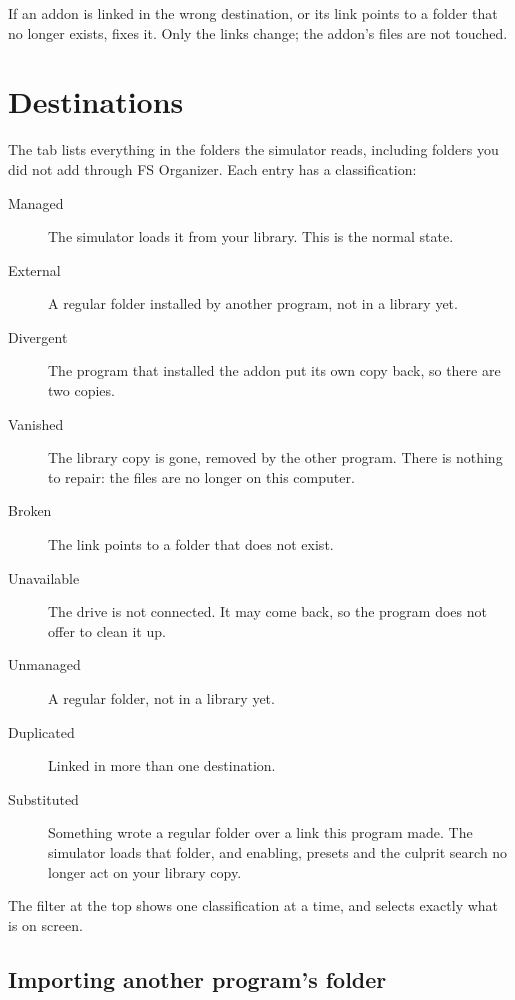\documentclass[11pt,a4paper]{article}
\begin{document}
If an addon is linked in the wrong destination, or its link points to a folder
that no longer exists,  fixes it. Only
the links change; the addon's files are not touched.

\section{Destinations}

The  tab lists everything in the folders the simulator reads,
including folders you did not add through FS Organizer. Each entry has a
classification:


\begin{description}
  \item[Managed] The simulator loads it from your library. This is the normal
    state.
  \item[External] A regular folder installed by another program, not in a
    library yet.
  \item[Divergent] The program that installed the addon put its own copy back,
    so there are two copies.
  \item[Vanished] The library copy is gone, removed by the other program. There
    is nothing to repair: the files are no longer on this computer.
  \item[Broken] The link points to a folder that does not exist.
  \item[Unavailable] The drive is not connected. It may come back, so the
    program does not offer to clean it up.
  \item[Unmanaged] A regular folder, not in a library yet.
  \item[Duplicated] Linked in more than one destination.
  \item[Substituted] Something wrote a regular folder over a link this program
    made. The simulator loads that folder, and enabling, presets and the culprit
    search no longer act on your library copy.
\end{description}

The filter at the top shows one classification at a time, and  selects exactly what is on screen.

\subsection{Importing another program's folder}
\end{document}
